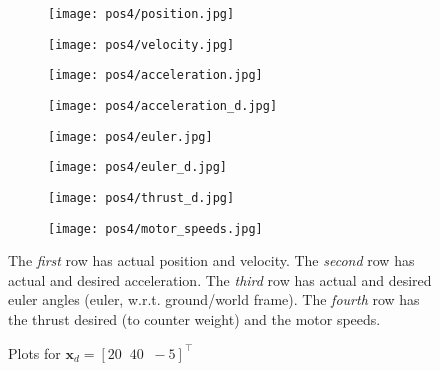 \begin{figure}[h]
    \centering
    \begin{subfigure}[b]{0.35\textwidth}
        \texttt{[image: pos4/position.jpg]}
    \end{subfigure}
    \begin{subfigure}[b]{0.35\textwidth}
        \texttt{[image: pos4/velocity.jpg]}
    \end{subfigure}
    \begin{subfigure}[b]{0.35\textwidth}
        \texttt{[image: pos4/acceleration.jpg]}
    \end{subfigure}
    \begin{subfigure}[b]{0.35\textwidth}
        \texttt{[image: pos4/acceleration\_d.jpg]}
    \end{subfigure}
    \begin{subfigure}[b]{0.35\textwidth}
        \texttt{[image: pos4/euler.jpg]}
    \end{subfigure}
    \begin{subfigure}[b]{0.35\textwidth}
        \texttt{[image: pos4/euler\_d.jpg]}
    \end{subfigure}
    \begin{subfigure}[b]{0.35\textwidth}
        \texttt{[image: pos4/thrust\_d.jpg]}
    \end{subfigure}
    \begin{subfigure}[b]{0.35\textwidth}
        \texttt{[image: pos4/motor\_speeds.jpg]}
    \end{subfigure}
    \caption{Plots for $\mathbf{x}_d = [20\;\;40\;\;-5]^\top$}
    \small
        The \emph{first} row has actual position and velocity.
        The \emph{second} row has actual and desired acceleration.
        The \emph{third} row has actual and desired euler angles (euler, w.r.t. ground/world frame).
        The \emph{fourth} row has the thrust desired (to counter weight) and the motor speeds.
\end{figure}
